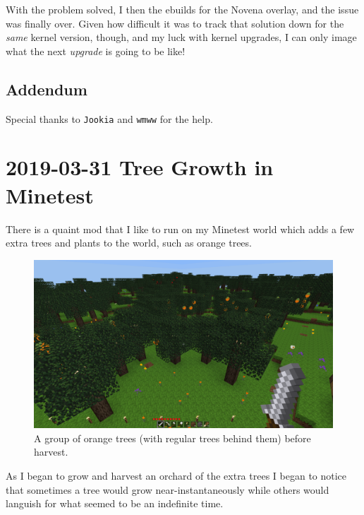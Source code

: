 \documentclass{article}
\begin{document}
With the problem solved, I then  the ebuilds for the Novena overlay, and the issue was finally over.  Given how difficult it was to track that solution down for the \emph{same} kernel version, though, and my luck with kernel upgrades, I can only image what the next \emph{upgrade} is going to be like!

\subsection{Addendum}
Special thanks to \texttt{Jookia} and \texttt{wmww} for the help.


\section{2019-03-31 Tree Growth in Minetest}
There is a quaint mod that I like to run on my Minetest world which adds a few extra trees and plants to the world, such as orange trees.

\begin{figure}
\includegraphics[scale=0.33]{files/blog/2019_03_31_tree_growth_in_minetest/2019_03_31_orange_trees.png}
\caption{A group of orange trees (with regular trees behind them) before harvest.}
\end{figure}

As I began to grow and harvest an orchard of the extra trees I began to notice that sometimes a tree would grow near-instantaneously while others would languish for what seemed to be an indefinite time.
\end{document}
